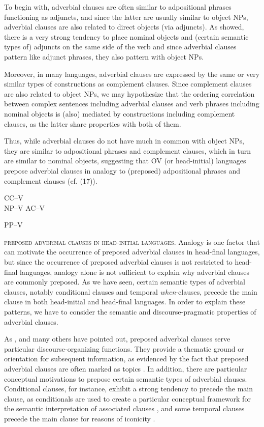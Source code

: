 \documentclass[output=paper]{langsci/langscibook}
\begin{document}
To begin with, adverbial clauses are often similar to adpositional phrases functioning as adjuncts, and since the latter are usually similar to object NPs, adverbial clauses are also related to direct objects (via adjuncts). As \citet{Dryer1992} showed, there is a very strong tendency to place nominal objects and (certain semantic types of) adjuncts on the same side of the verb and since adverbial clauses pattern like adjunct phrases, they also pattern with object NPs. 

Moreover, in many languages, adverbial clauses are expressed by the same or very similar types of constructions as complement clauses. Since complement clauses are also related to object NPs, we may hypothesize that the ordering correlation between complex sentences including adverbial clauses and verb phrases including nominal objects is (also) mediated by constructions including complement clauses, as the latter share properties with both of them.

Thus, while adverbial clauses do not have much in common with object NPs, they are similar to adpositional phrases and complement clauses, which in turn are similar to nominal objects, suggesting that OV (or head-initial) languages prepose adverbial clauses in analogy to (preposed) adpositional phrases and complement clauses (cf. (17)).

\ea\label{ex:key:}  

                    CC–V\\ 
  NP–V    AC–V

    PP–V
    \z

\textsc{preposed} \textsc{adverbial} \textsc{clauses} \textsc{in} \textsc{head-initial} \textsc{languages}. Analogy is one factor that can motivate the occurrence of preposed adverbial clauses in head-final languages, but since the occurrence of preposed adverbial clauses is not restricted to head-final languages, analogy alone is not sufficient to explain why adverbial clauses are commonly preposed. As we have seen, certain semantic types of adverbial clauses, notably conditional clauses and temporal \textit{when}-clauses, precede the main clause in both head-initial and head-final languages. In order to explain these patterns, we have to consider the semantic and discourse-pragmatic properties of adverbial clauses.

As \citet{Chafe1984}, \citet{Givón1984} and many others have pointed out, preposed adverbial clauses serve particular discourse-organizing functions. They provide a thematic ground or orientation for subsequent information, as evidenced by the fact that preposed adverbial clauses are often marked as topics \citep{Haiman1978}. In addition, there are particular conceptual motivations to prepose certain semantic types of adverbial clauses. Conditional clauses, for instance, exhibit a strong tendency to precede the main clause, as conditionals are used to create a particular conceptual framework for the semantic interpretation of associated clauses \citep{Diessel2005}, and some temporal clauses precede the main clause for reasons of iconicity \citep{Diessel2008}. 
\end{document}
